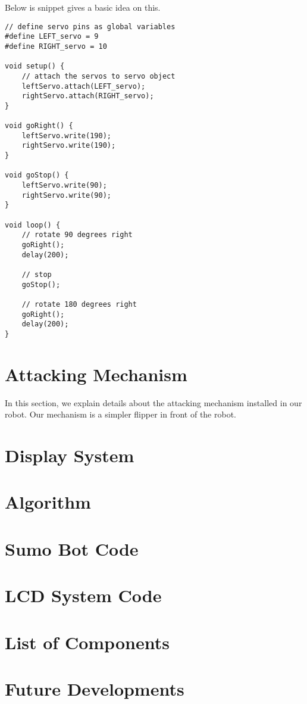 \documentclass[11pt, letterpaper, oneside]{article}
\begin{document}
Below is snippet gives a basic idea on this.
\begin{verbatim}
// define servo pins as global variables
#define LEFT_servo = 9 
#define RIGHT_servo = 10

void setup() {
    // attach the servos to servo object
    leftServo.attach(LEFT_servo); 
    rightServo.attach(RIGHT_servo); 
}

void goRight() {
    leftServo.write(190);
    rightServo.write(190);
}

void goStop() {
    leftServo.write(90);
    rightServo.write(90);
}

void loop() {
    // rotate 90 degrees right
    goRight();
    delay(200);
    
    // stop
    goStop();
    
    // rotate 180 degrees right
    goRight();
    delay(200);
}
\end{verbatim}



\newpage
\section{Attacking Mechanism} \label{sec:attacking}
In this section, we explain details about the attacking mechanism installed in our robot. Our mechanism is a simpler flipper in front of the robot.

\newpage
\section{Display System}

\newpage
\section{Algorithm}

\newpage
\section{Sumo Bot Code}

\newpage
\section{LCD System Code}

\newpage
\section{List of Components}

\newpage
\section{Future Developments}
\end{document}
